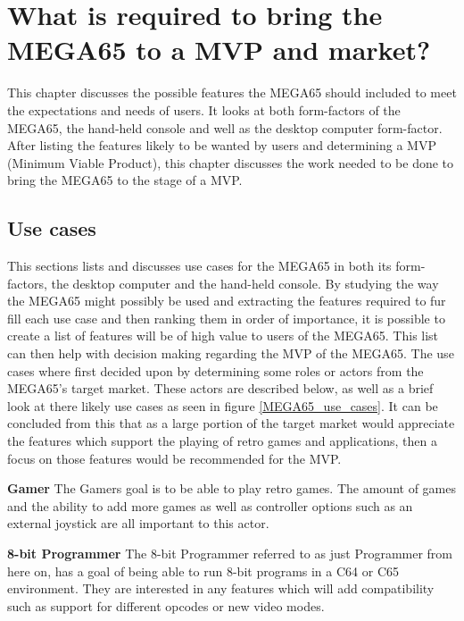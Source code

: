 
\chapter{What is required to bring the MEGA65 to a MVP and market?}
\label{Chapter7}
This chapter discusses the possible features the MEGA65 should included to meet the expectations and needs of users. It looks at both form-factors of the MEGA65, the hand-held console and well as the desktop computer form-factor. After listing the features likely to be wanted by users and determining a MVP (Minimum Viable Product), this chapter discusses the work needed to be done to bring the MEGA65 to the stage of a MVP.


\section{Use cases}
This sections lists and discusses use cases for the MEGA65 in both its form-factors, the desktop computer and the hand-held console. By studying the way the MEGA65 might possibly be used and extracting the features required to fur fill each use case and then ranking them in order of importance, it is possible to create a list of features will be of high value to users of the MEGA65. This list can then help with decision making regarding the MVP of the MEGA65. The use cases where first decided upon by determining some roles or actors from the MEGA65's target market. These actors are described below, as well as a brief look at there likely use cases as seen in figure \ref{MEGA65_use_cases}. It can be concluded from this that as a large portion of the target market would appreciate the features which support the playing of retro games and applications, then a focus on those features would be recommended for the MVP.

\textbf{Gamer}
The Gamers goal is to be able to play retro games. The amount of games and the ability to add more games as well as controller options such as an external joystick are all important to this actor.

\textbf{8-bit Programmer}
The 8-bit Programmer referred to as just Programmer from here on, has a goal of being able to run 8-bit programs in a C64 or C65 environment. They are interested in any features which will add compatibility such as support for different opcodes or new video modes. 

